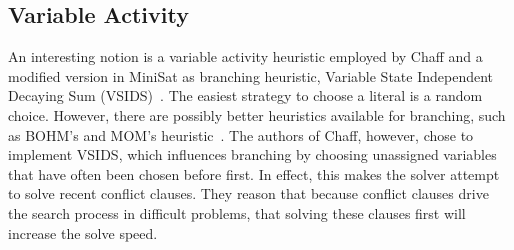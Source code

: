 \subsection{Variable Activity}
	An interesting notion is a variable activity heuristic employed by Chaff and a modified version in MiniSat as branching heuristic,
	Variable State Independent Decaying Sum (VSIDS)~\cite{moskewicz2001chaff}.
	The easiest strategy to choose a literal is a random choice.
	However, there are possibly better heuristics available for branching,
	such as BOHM's and MOM's heuristic~\cite{marques1999impact}.
	The authors of Chaff, however, chose to implement VSIDS,
	which influences branching by choosing unassigned variables that have often been chosen before first.
	In effect, this makes the solver attempt to solve recent conflict clauses.
	They reason that because conflict clauses drive the search process in difficult problems,
	that solving these clauses first will increase the solve speed.
